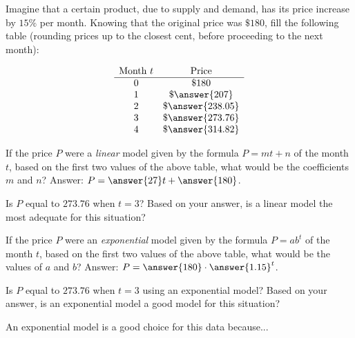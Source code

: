 \documentclass{ximera}
\author{Ivo Terek}
\begin{document}
\begin{exercise}
 \calcHW  Imagine that a certain product, due to supply and demand, has its price increase by $15\%$ per month. Knowing that the original price was $\$180$, fill the following table (rounding prices up to the closest cent, before proceeding to the next month):

  $$
\begin{array}{cc}
\text{Month } t& \text{Price}\\
\hline
0 & \${180}\\
1& \$\answer{207}\\
2&\$\answer{238.05} \\
3&\$\answer{273.76} \\
4&\$\answer{314.82}
\end{array}
$$

\begin{exercise}
  If the price $P$ were a \emph{linear} model given by the formula $P = mt+n$ of the month $t$, based on the first two values of the above table, what would be the coefficients $m$ and $n$? Answer: $P = \answer{27}t+\answer{180}$.

  \begin{exercise}
    Is $P$ equal to $273.76$ when $t=3$? Based on your answer, is a linear model the most adequate for this situation?
    \begin{multipleChoice}
    \end{multipleChoice}
 
\begin{exercise}
  If the price $P$ were an \emph{exponential} model given by the formula $P = ab^t$ of the month $t$, based on the first two values of the above table, what would be the values of $a$ and $b$? Answer: $P = \answer{180} \cdot \answer{1.15}^t$.

  \begin{exercise}
    Is $P$ equal to $273.76$ when $t=3$ using an exponential model?  Based on your answer, is an exponential model a good model for this situation?
    \begin{multipleChoice}
    \end{multipleChoice}
 
\begin{exercise}
 An exponential model is a good choice for this data because...
    \begin{multipleChoice}
    \end{multipleChoice}
 




\end{exercise}
\end{exercise}
\end{exercise}
\end{exercise}
\end{exercise}
\end{exercise}
\end{document}
